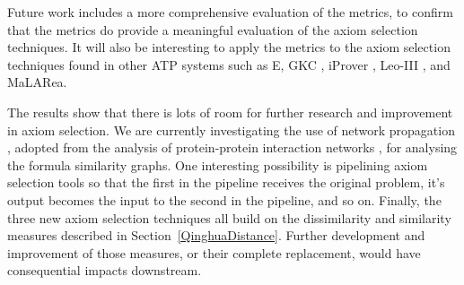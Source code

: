 \documentclass[]{ceurart}
\begin{document}
Future work includes a more comprehensive evaluation of the metrics, to
confirm that the metrics do provide a meaningful evaluation of the axiom
selection techniques.
It will also be interesting to apply the metrics to the axiom selection
techniques found in other ATP systems such as E, GKC \cite{Tam19},
iProver \cite{Kor08}, Leo-III \cite{SB18}, and MaLARea.

The results show that there is lots of room for further research and 
improvement in axiom selection.
We are currently investigating the use of network propagation \cite{SY07}, 
adopted from the analysis of protein-protein interaction networks
\cite{DD+20}, for analysing the formula similarity graphs.  
One interesting possibility is pipelining axiom selection tools so that
the first in the pipeline receives the original problem, it's output
becomes the input to the second in the pipeline, and so on.
Finally, the three new axiom selection techniques all build on the
dissimilarity and similarity measures described in 
Section~\ref{QinghuaDistance}.
Further development and improvement of those measures, or their complete
replacement, would have consequential impacts downstream.

% 

\end{document}
